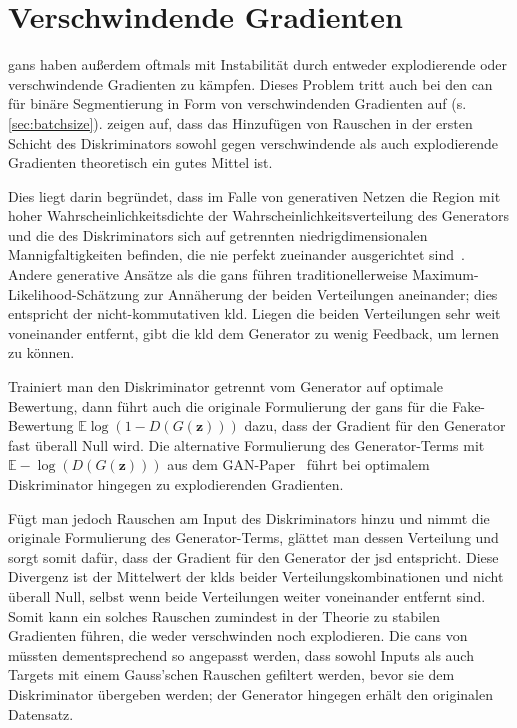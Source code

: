 \section{Verschwindende Gradienten}

\glspl{gan} haben außerdem oftmals mit Instabilität durch entweder explodierende oder verschwindende Gradienten zu kämpfen.
Dieses Problem tritt auch bei den \gls{can} für binäre Segmentierung in Form von verschwindenden Gradienten auf (s. \autoref{sec:batchsize}).
\citeauthor{Arjovsky.2017} zeigen auf, dass das Hinzufügen von Rauschen in der ersten Schicht des Diskriminators sowohl gegen verschwindende als auch explodierende Gradienten theoretisch ein gutes Mittel ist.

Dies liegt darin begründet, dass im Falle von generativen Netzen die Region mit hoher Wahrscheinlichkeitsdichte der Wahrscheinlichkeitsverteilung des Generators und die des Diskriminators sich auf getrennten niedrigdimensionalen Mannigfaltigkeiten befinden, die nie perfekt zueinander ausgerichtet sind~\cite{Arjovsky.2017}.
Andere generative Ansätze als die \glspl{gan} führen traditionellerweise Maximum-Likelihood-Schätzung zur Annäherung der beiden Verteilungen aneinander; dies entspricht der nicht-kommutativen \gls{kld}.
Liegen die beiden Verteilungen sehr weit voneinander entfernt, gibt die \gls{kld} dem Generator zu wenig Feedback, um lernen zu können.

Trainiert man den Diskriminator getrennt vom Generator auf optimale Bewertung, dann führt auch die originale Formulierung der \glspl{gan} für die Fake-Bewertung $ \mathbb{E}\log(1 - D(G(\mathbf{z}))) $ dazu, dass der Gradient für den Generator fast überall Null wird.
Die alternative Formulierung des Generator-Terms mit $ \mathbb{E}-\log(D(G(\mathbf{z}))) $ aus dem GAN-Paper~\cite{Goodfellow.2014} führt bei optimalem Diskriminator hingegen zu explodierenden Gradienten.

Fügt man jedoch Rauschen am Input des Diskriminators hinzu und nimmt die originale Formulierung des Generator-Terms, glättet man dessen Verteilung und sorgt somit dafür, dass der Gradient für den Generator der \gls{jsd} entspricht.
Diese Divergenz ist der Mittelwert der \glspl{kld} beider Verteilungskombinationen und nicht überall Null, selbst wenn beide Verteilungen weiter voneinander entfernt sind.
Somit kann ein solches Rauschen zumindest in der Theorie zu stabilen Gradienten führen, die weder verschwinden noch explodieren.
Die \glspl{can} von \citeauthor{Isola.2017} müssten dementsprechend so angepasst werden, dass sowohl Inputs als auch Targets mit einem Gauss'schen Rauschen gefiltert werden, bevor sie dem Diskriminator übergeben werden; der Generator hingegen erhält den originalen Datensatz.




